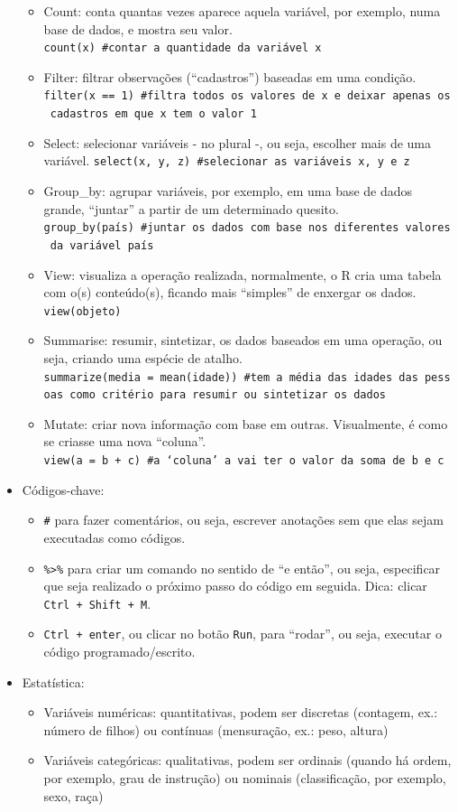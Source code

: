 \documentclass[
  10pt,
  brazil,
  a4paper,
  twoside, notitlepage, openright]{book}
\providecommand{\tightlist}{%
  \setlength{\itemsep}{0pt}\setlength{\parskip}{0pt}}
\begin{document}
\begin{itemize}
  \begin{itemize}
  \tightlist
  \item
    Count: conta quantas vezes aparece aquela variável, por exemplo, numa base de dados, e mostra seu valor. \texttt{count(x)\ \#contar\ a\ quantidade\ da\ variável\ x}
  \item
    Filter: filtrar observações (``cadastros'') baseadas em uma condição. \texttt{filter(x\ ==\ 1)\ \#filtra\ todos\ os\ valores\ de\ x\ e\ deixar\ apenas\ os\ cadastros\ em\ que\ x\ tem\ o\ valor\ 1}
  \item
    Select: selecionar variáveis - no plural -, ou seja, escolher mais de uma variável. \texttt{select(x,\ y,\ z)\ \#selecionar\ as\ variáveis\ x,\ y\ e\ z}
  \item
    Group\_by: agrupar variáveis, por exemplo, em uma base de dados grande, ``juntar'' a partir de um determinado quesito. \texttt{group\_by(país)\ \#juntar\ os\ dados\ com\ base\ nos\ diferentes\ valores\ da\ variável\ país}
  \item
    View: visualiza a operação realizada, normalmente, o R cria uma tabela com o(s) conteúdo(s), ficando mais ``simples'' de enxergar os dados. \texttt{view(objeto)}
  \item
    Summarise: resumir, sintetizar, os dados baseados em uma operação, ou seja, criando uma espécie de atalho. \texttt{summarize(media\ =\ mean(idade))\ \#tem\ a\ média\ das\ idades\ das\ pessoas\ como\ critério\ para\ resumir\ ou\ sintetizar\ os\ dados}
  \item
    Mutate: criar nova informação com base em outras. Visualmente, é como se criasse uma nova ``coluna''. \texttt{view(a\ =\ b\ +\ c)\ \#a\ ‘coluna’\ a\ vai\ ter\ o\ valor\ da\ soma\ de\ b\ e\ c}
  \end{itemize}
\item
  Códigos-chave:

  \begin{itemize}
  \tightlist
  \item
    \texttt{\#} para fazer comentários, ou seja, escrever anotações sem que elas sejam executadas como códigos.
  \item
    \texttt{\%\textgreater{}\%} para criar um comando no sentido de ``e então'', ou seja, especificar que seja realizado o próximo passo do código em seguida. Dica: clicar \texttt{Ctrl\ +\ Shift\ +\ M}.
  \item
    \texttt{Ctrl\ +\ enter}, ou clicar no botão \texttt{Run}, para ``rodar'', ou seja, executar o código programado/escrito.
  \end{itemize}
\item
  Estatística:

  \begin{itemize}
  \tightlist
  \item
    Variáveis numéricas: quantitativas, podem ser discretas (contagem, ex.: número de filhos) ou contínuas (mensuração, ex.: peso, altura)
  \item
    Variáveis categóricas: qualitativas, podem ser ordinais (quando há ordem, por exemplo, grau de instrução) ou nominais (classificação, por exemplo, sexo, raça)
  \end{itemize}
\end{itemize}

  
\end{document}
